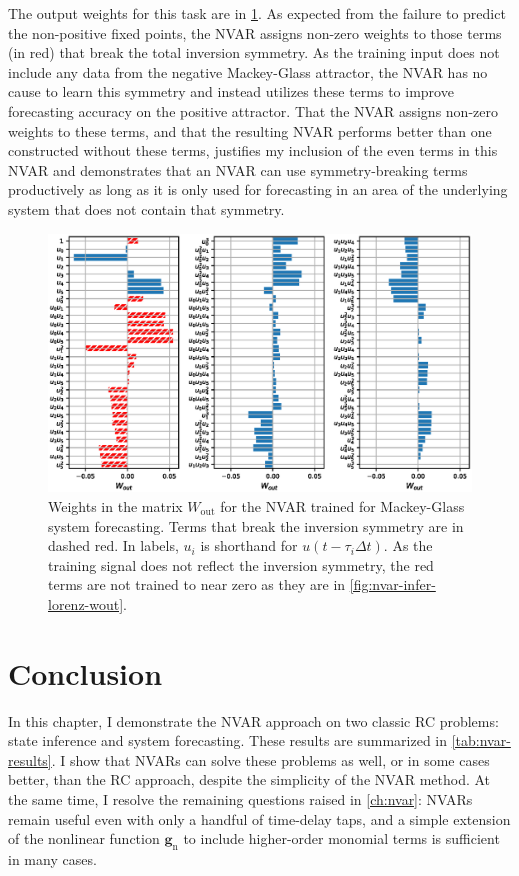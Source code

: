 The output weights for this task are in
\cref{fig:nvar-predict-mackey-glass-wout}. As expected from the
failure to predict the non-positive fixed points, the NVAR
assigns non-zero weights to those terms (in red) that break the
total inversion symmetry. As the training input does not include any
data from the negative Mackey-Glass attractor, the NVAR has no cause
to learn this symmetry and instead utilizes these terms to improve
forecasting accuracy on the positive attractor. That the NVAR assigns
non-zero weights to these terms, and that the resulting NVAR performs
better than one constructed without these terms, justifies my
inclusion of the even terms in this NVAR and demonstrates that an NVAR
can use symmetry-breaking terms productively as long as it is only
used for forecasting in an area of the underlying system that does not
contain that symmetry.

\begin{figure}
  \includegraphics[width=\textwidth]{figures/nvar-predict-mackey-glass-wout}
  \caption{Weights in the matrix $W_\text{out}$ for the NVAR trained
    for Mackey-Glass system forecasting. Terms that break the
    inversion symmetry are in dashed red. In labels, $u_i$ is shorthand for $u(t - \tau_i \Delta t)$. As the training signal does not
    reflect the inversion symmetry, the red terms are not trained to
    near zero as they are in \cref{fig:nvar-infer-lorenz-wout}.}
  \label{fig:nvar-predict-mackey-glass-wout}
\end{figure}

\section{Conclusion}

In this chapter, I demonstrate the NVAR approach on two classic
RC problems: state inference and system forecasting.
These results are summarized in \cref{tab:nvar-results}.
I show that
NVARs can solve these problems as well, or in some cases better, than
the RC approach, despite the simplicity of the NVAR method. At the
same time, I resolve the remaining questions raised in
\cref{ch:nvar}: NVARs remain useful even with only a handful of
time-delay taps, and a simple extension of the nonlinear function
$\bm{g}_\text{n}$ to include higher-order monomial terms is sufficient
in many cases.

